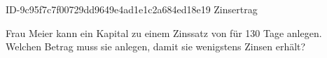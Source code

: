 \begin{exercise}
      {ID-9c95f7c7f00729dd9649e4ad1e1c2a684ed18e19}
      {Zinsertrag}
  \ifproblem\problem\par
    Frau Meier kann ein Kapital zu einem Zinssatz von  für \num{130}
    Tage anlegen. Welchen Betrag muss sie anlegen, damit sie wenigstens
     Zinsen erhält?
  \fi
\end{exercise}

